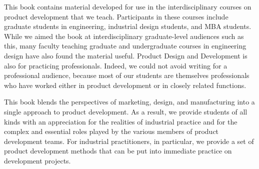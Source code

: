%
%
%
%
%
%

\begin{acknowledgements}
This book contains material developed for use
in the interdisciplinary courses on product development that we teach.
Participants in these courses include graduate students in engineering,
industrial design students, and MBA students. While we
aimed the book at interdisciplinary graduate-level audiences such
as this, many faculty teaching graduate and undergraduate courses
in engineering design have also found the material useful. Product
Design and Development is also for practicing professionals. Indeed,
we could not avoid writing  for  a  professional  audience,
because  most  of  our  students  are  themselves professionals who have worked
either in product development or in closely related functions.

This book blends the perspectives of marketing, design, and manufacturing into
a single approach to product development. As a result, we provide students
of all kinds with an appreciation for the realities of industrial practice
and for the complex and essential roles played by the various members of
product development teams. For industrial practitioners, in  particular,
we  provide  a  set  of  product  development  methods  that  can  be
put  into immediate practice on development projects.
\end{acknowledgements}
